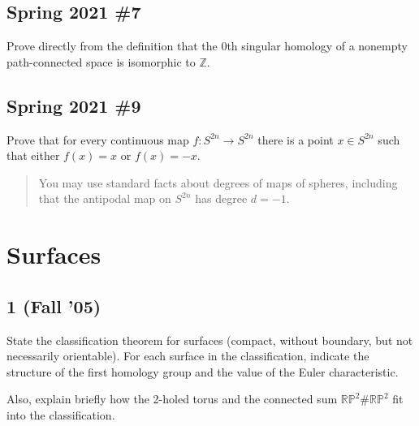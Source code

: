 \hypertarget{spring-2021-7}{%
\subsection{Spring 2021 \#7}\label{spring-2021-7}}

\begin{problem}[Spring 2021, 7]

Prove directly from the definition that the 0th singular homology of a
nonempty path-connected space is isomorphic to \({\mathbb{Z}}\).

\end{problem}

\hypertarget{spring-2021-9}{%
\subsection{Spring 2021 \#9}\label{spring-2021-9}}

\begin{problem}[Spring 2021, 9]

Prove that for every continuous map \(f: S^{2n} \to S^{2n}\) there is a
point \(x\in S^{2n}\) such that either \(f(x) = x\) or \(f(x) = -x\).

\begin{quote}
You may use standard facts about degrees of maps of spheres, including
that the antipodal map on \(S^{2n}\) has degree \(d=-1\).
\end{quote}

\end{problem}

\hypertarget{surfaces}{%
\section{Surfaces}\label{surfaces}}

\hypertarget{fall-05-3}{%
\subsection{1 (Fall '05)}\label{fall-05-3}}

State the classification theorem for surfaces (compact, without
boundary, but not necessarily orientable). For each surface in the
classification, indicate the structure of the first homology group and
the value of the Euler characteristic.

Also, explain briefly how the 2-holed torus and the connected sum
\({\mathbb{RP}}^2 \# {\mathbb{RP}}^2\) fit into the classification.

